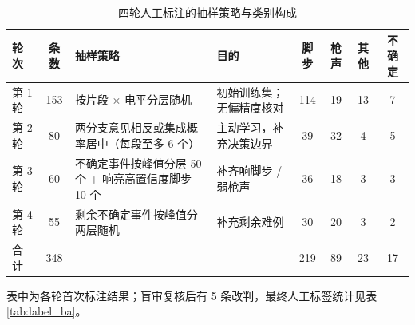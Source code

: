\begin{table}[htbp]\centering
\caption{四轮人工标注的抽样策略与类别构成}\label{tab:rounds}
{\small\begin{threeparttable}
\begin{tabularx}{\linewidth}{lcLLcccc}\toprule
轮次 & 条数 & 抽样策略 & 目的 & 脚步 & 枪声 & 其他 & 不确定 \\
\midrule
第 1 轮 & 153 & 按片段 $\times$ 电平分层随机 & 初始训练集；无偏精度核对 & 114 & 19 & 13 & 7 \\
第 2 轮 & 80 & 两分支意见相反或集成概率居中（每段至多 6 个） & 主动学习，补充决策边界 & 39 & 32 & 4 & 5 \\
第 3 轮 & 60 & 不确定事件按峰值分层 50 个 + 响亮高置信度脚步 10 个 & 补齐响脚步 / 弱枪声 & 36 & 18 & 3 & 3 \\
第 4 轮 & 55 & 剩余不确定事件按峰值分两层随机 & 补充剩余难例 & 30 & 20 & 3 & 2 \\
合计 & 348 &  &  & 219 & 89 & 23 & 17 \\
\bottomrule\end{tabularx}
\begin{tablenotes}\footnotesize\item 表中为各轮首次标注结果；盲审复核后有 5 条改判，最终人工标签统计见表 \ref{tab:label_ba}。\end{tablenotes}\end{threeparttable}}
\end{table}

